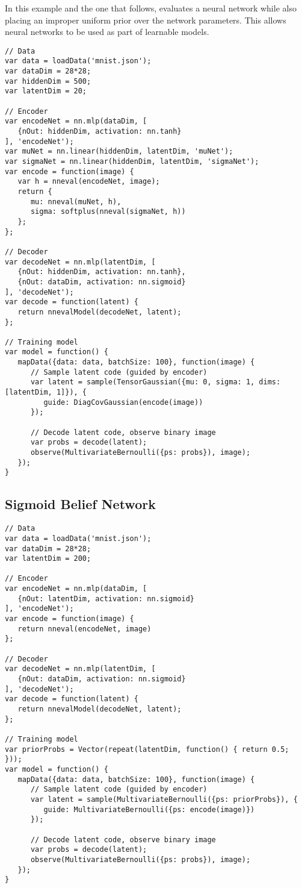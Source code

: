 In this example and the one that follows,  evaluates a neural network while also placing an improper uniform prior over the network parameters. This allows neural networks to be used as part of learnable models.

\begin{lstlisting}
// Data
var data = loadData('mnist.json');
var dataDim = 28*28;
var hiddenDim = 500;
var latentDim = 20;

// Encoder
var encodeNet = nn.mlp(dataDim, [
   {nOut: hiddenDim, activation: nn.tanh}
], 'encodeNet');
var muNet = nn.linear(hiddenDim, latentDim, 'muNet');
var sigmaNet = nn.linear(hiddenDim, latentDim, 'sigmaNet');
var encode = function(image) {
   var h = nneval(encodeNet, image);
   return {
      mu: nneval(muNet, h),
      sigma: softplus(nneval(sigmaNet, h))
   };
};

// Decoder
var decodeNet = nn.mlp(latentDim, [
   {nOut: hiddenDim, activation: nn.tanh},
   {nOut: dataDim, activation: nn.sigmoid}
], 'decodeNet');
var decode = function(latent) {
   return nnevalModel(decodeNet, latent);
};

// Training model
var model = function() {
   mapData({data: data, batchSize: 100}, function(image) {
      // Sample latent code (guided by encoder)
      var latent = sample(TensorGaussian({mu: 0, sigma: 1, dims: [latentDim, 1]}), {
         guide: DiagCovGaussian(encode(image))
      });

      // Decode latent code, observe binary image
      var probs = decode(latent);
      observe(MultivariateBernoulli({ps: probs}), image);
   });
}
\end{lstlisting}


\subsection{Sigmoid Belief Network}
\label{sec:appendix_code:sbn}

\begin{lstlisting}
// Data
var data = loadData('mnist.json');
var dataDim = 28*28;
var latentDim = 200;

// Encoder
var encodeNet = nn.mlp(dataDim, [
   {nOut: latentDim, activation: nn.sigmoid}
], 'encodeNet');
var encode = function(image) {
   return nneval(encodeNet, image)
};

// Decoder
var decodeNet = nn.mlp(latentDim, [
   {nOut: dataDim, activation: nn.sigmoid}
], 'decodeNet');
var decode = function(latent) {
   return nnevalModel(decodeNet, latent);
};

// Training model
var priorProbs = Vector(repeat(latentDim, function() { return 0.5; }));
var model = function() {
   mapData({data: data, batchSize: 100}, function(image) {
      // Sample latent code (guided by encoder)
      var latent = sample(MultivariateBernoulli({ps: priorProbs}), {
         guide: MultivariateBernoulli({ps: encode(image)})
      });

      // Decode latent code, observe binary image
      var probs = decode(latent);
      observe(MultivariateBernoulli({ps: probs}), image);
   });
}
\end{lstlisting}


